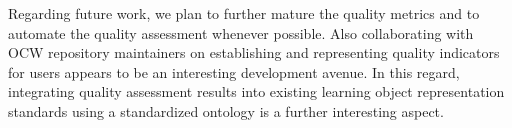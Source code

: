 \documentclass{sig-alternate}
\theoremstyle{definition}
\begin{document}
Regarding future work, we plan to further mature the quality metrics and to automate the quality assessment whenever possible.
Also collaborating with OCW repository maintainers on establishing and representing quality indicators for users appears to be an interesting development avenue.
In this regard, integrating quality assessment results into existing learning object representation standards using a standardized ontology is a further interesting aspect.

\printbibliography
\iflak
\balancecolumns

\fi
\end{document}
